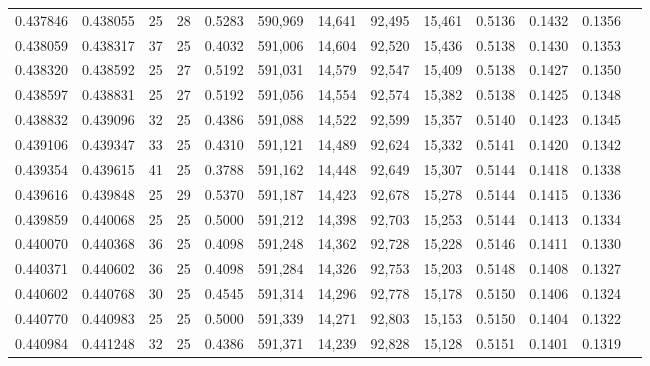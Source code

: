 \begin{tabular}{rrrrrrrrrrrrr}
0.437846 & 0.438055 &    25 &  28 &                                     0.5283 & 590,969 &  14,641 &  92,495 &  15,461 & 0.5136 & 0.1432 & 0.1356 \\
0.438059 & 0.438317 &    37 &  25 &                                     0.4032 & 591,006 &  14,604 &  92,520 &  15,436 & 0.5138 & 0.1430 & 0.1353 \\
0.438320 & 0.438592 &    25 &  27 &                                     0.5192 & 591,031 &  14,579 &  92,547 &  15,409 & 0.5138 & 0.1427 & 0.1350 \\
0.438597 & 0.438831 &    25 &  27 &                                     0.5192 & 591,056 &  14,554 &  92,574 &  15,382 & 0.5138 & 0.1425 & 0.1348 \\
0.438832 & 0.439096 &    32 &  25 &                                     0.4386 & 591,088 &  14,522 &  92,599 &  15,357 & 0.5140 & 0.1423 & 0.1345 \\
0.439106 & 0.439347 &    33 &  25 &                                     0.4310 & 591,121 &  14,489 &  92,624 &  15,332 & 0.5141 & 0.1420 & 0.1342 \\
0.439354 & 0.439615 &    41 &  25 &                                     0.3788 & 591,162 &  14,448 &  92,649 &  15,307 & 0.5144 & 0.1418 & 0.1338 \\
0.439616 & 0.439848 &    25 &  29 &                                     0.5370 & 591,187 &  14,423 &  92,678 &  15,278 & 0.5144 & 0.1415 & 0.1336 \\
0.439859 & 0.440068 &    25 &  25 &                                     0.5000 & 591,212 &  14,398 &  92,703 &  15,253 & 0.5144 & 0.1413 & 0.1334 \\
0.440070 & 0.440368 &    36 &  25 &                                     0.4098 & 591,248 &  14,362 &  92,728 &  15,228 & 0.5146 & 0.1411 & 0.1330 \\
0.440371 & 0.440602 &    36 &  25 &                                     0.4098 & 591,284 &  14,326 &  92,753 &  15,203 & 0.5148 & 0.1408 & 0.1327 \\
0.440602 & 0.440768 &    30 &  25 &                                     0.4545 & 591,314 &  14,296 &  92,778 &  15,178 & 0.5150 & 0.1406 & 0.1324 \\
0.440770 & 0.440983 &    25 &  25 &                                     0.5000 & 591,339 &  14,271 &  92,803 &  15,153 & 0.5150 & 0.1404 & 0.1322 \\
0.440984 & 0.441248 &    32 &  25 &                                     0.4386 & 591,371 &  14,239 &  92,828 &  15,128 & 0.5151 & 0.1401 & 0.1319 \\

\end{tabular}
